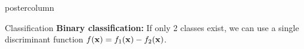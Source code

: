 \documentclass{beamer}
\begin{document}
\begin{frame}[fragile]{}
\begin{columns}
\begin{column}{.31\textwidth}
\begin{beamercolorbox}[center]{postercolumn}
\begin{minipage}{.98\textwidth}
{\begin{myblock}{Classification}
\textbf{Binary classification: }If only 2 classes exist, we can use a single discriminant function $f(\mathbf{x}) = f_{1}(\mathbf{x}) - f_{2}(\mathbf{x})$.  

\end{myblock}
			  }
			\end{minipage}
		\end{beamercolorbox}
	\end{column}
\end{columns}

\end{frame}
\end{document}
